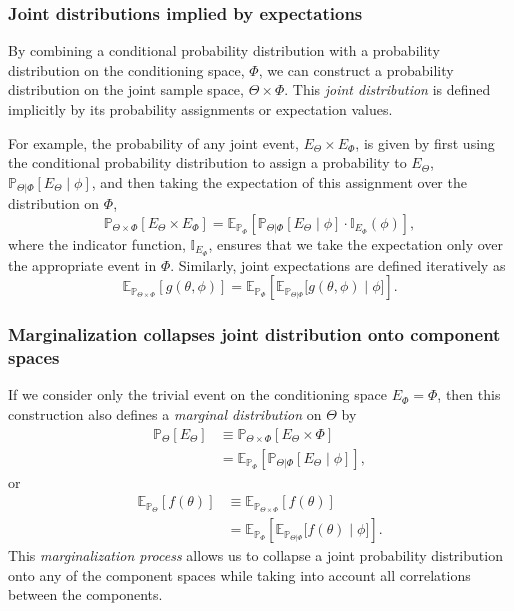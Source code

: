 \documentclass[11pt, oneside]{article}
\newcommand{\PP}{ \mathbb{P} }
\newcommand{\EE}{ \mathbb{E} }
\begin{document}
\subsubsection*{Joint distributions implied by expectations}

By combining a conditional probability distribution with a probability distribution 
on the conditioning space, $\Phi$, we can construct a probability distribution on 
the joint sample space, $\Theta \times \Phi$. This \emph{joint distribution} is 
defined implicitly by its probability assignments or expectation values.  

For example, the probability of any joint event, 
$E_{\Theta} \times E_{\Phi}$, is given by first using the conditional 
probability distribution to assign a probability to $E_{\Theta}$, 
$\PP_{\Theta|\Phi} \! \left[ E_{\Theta} \mid \phi \right]$, and then 
taking the expectation of this assignment over the distribution on $\Phi$,
%
\begin{equation*}
\PP_{\Theta \times \Phi} \! \left[ E_{\Theta} \times E_{\Phi} \right]
=
\mathbb{E}_{\PP_{\Phi}} \! \left[  
\PP_{\Theta|\Phi} \! \left[ E_{\Theta} \mid \phi \right] 
\cdot \mathbb{I}_{E_{\Phi}} \! \left( \phi \right)
\right],
\end{equation*}
%
where the indicator function, $\mathbb{I}_{E_{\Phi}}$, ensures that we 
take the expectation only over the appropriate event in $\Phi$.  Similarly, 
joint expectations are defined iteratively as
%
\begin{equation*}
\EE_{\PP_{\Theta \times \Phi}} \! \left[ g \! \left( \theta, \phi \right) \right]
=
\mathbb{E}_{\PP_{\Phi}} \! \left[  
\EE_{\PP_{\Theta|\Phi}} \! \Big[ 
g \! \left( \theta, \phi \right) \mid \phi 
\Big]
\right].
\end{equation*}


\subsubsection*{Marginalization collapses joint distribution onto component spaces}

If we consider only the trivial event on the conditioning space $E_{\Phi} 
= \Phi$, then this construction also defines a  \emph{marginal distribution} 
on $\Theta$ by
%
\begin{align*}
\PP_{\Theta} \! \left[ E_{\Theta} \right]
&\equiv
\PP_{\Theta \times \Phi} \! \left[ E_{\Theta} \times \Phi \right] \\
&=
\mathbb{E}_{\PP_{\Phi}} \! \left[  
\PP_{\Theta|\Phi} \! \left[ E_{\Theta} \mid \phi \right]
\right],
\end{align*}
or
%
\begin{align*}
\EE_{\PP_{\Theta}} \! \left[ f \! \left( \theta \right) \right]
&\equiv
\EE_{\PP_{\Theta \times \Phi}} \! \left[ f \! \left( \theta \right) \right] \\
&=
\mathbb{E}_{\PP_{\Phi}} \! \left[  
\EE_{\PP_{\Theta|\Phi}} \! \Big[ 
f \! \left( \theta \right) \mid \phi 
\Big]
\right].
\end{align*}
%
This \emph{marginalization process} allows us to collapse a joint probability 
distribution onto any of the component spaces while taking into account 
all correlations between the components.
\end{document}
